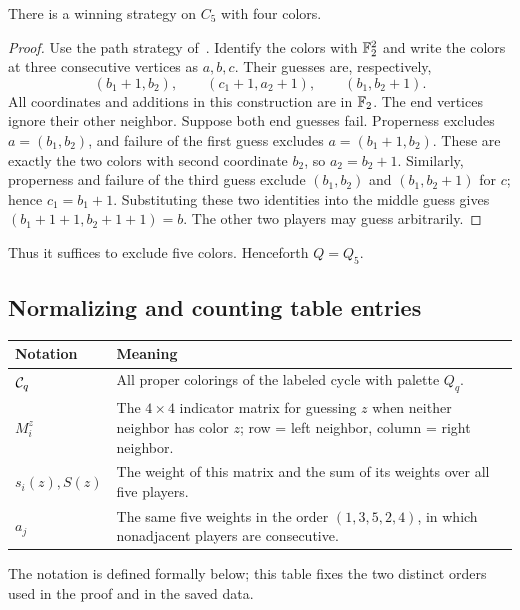 \begin{proposition}\label{prop:four}
There is a winning strategy on $C_5$ with four colors.
\end{proposition}
\begin{proof}
Use the path strategy of~\cite[Lemma~4.1]{proper}. Identify the colors with
$\mathbb{F}_2^2$ and write the colors at three consecutive vertices as $a,b,c$.
Their guesses are, respectively,
\[
(b_1+1,b_2),\qquad(c_1+1,a_2+1),\qquad(b_1,b_2+1).
\]
All coordinates and additions in this construction are in $\mathbb{F}_2$.
The end vertices ignore their other neighbor. Suppose both end guesses
fail. Properness excludes $a=(b_1,b_2)$, and failure of the first guess
excludes $a=(b_1+1,b_2)$. These are exactly the two colors with second
coordinate $b_2$, so $a_2=b_2+1$. Similarly, properness and failure of
the third guess exclude $(b_1,b_2)$ and $(b_1,b_2+1)$ for $c$; hence
$c_1=b_1+1$. Substituting these two identities into the middle guess
gives $(b_1+1+1,b_2+1+1)=b$.
The other two players may guess arbitrarily.
\end{proof}

Thus it suffices to exclude five colors. Henceforth $Q=Q_5$.

\subsection{Normalizing and counting table entries}
\begin{center}\small
\begin{tabular}{@{}lp{10.3cm}@{}}
\toprule
Notation&Meaning\\
\midrule
$\mathcal{C}_q$&All proper colorings of the labeled cycle with palette $Q_q$.\\
$M_i^z$&The $4\times4$ indicator matrix for guessing $z$ when neither
neighbor has color $z$; row = left neighbor, column = right neighbor.\\
$s_i(z),S(z)$&The weight of this matrix and the sum of its weights over all five players.\\
$a_j$&The same five weights in the order $(1,3,5,2,4)$, in which
nonadjacent players are consecutive.\\
\bottomrule
\end{tabular}
\end{center}
The notation is defined formally below; this table fixes the two distinct
orders used in the proof and in the saved data.

